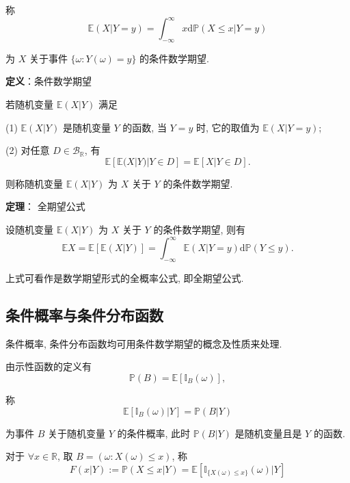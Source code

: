 \documentclass[openany]{ctexbook}
\theoremstyle{kaiti}
\theoremstyle{normal}
\begin{document}
称
\begin{equation}
  \mathbb{E}(X|Y=y)=\int_{-\infty}^\infty x\mathrm{d}\mathbb{P}(X\leqslant x|Y=y)
\end{equation}

为 $X$ 关于事件 $\{\omega:Y(\omega)=y\}$ 的条件数学期望.

\textbf{定义}：条件数学期望

若随机变量 $\mathbb{E}(X|Y)$ 满足

(1) $\mathbb{E}(X|Y)$ 是随机变量 $Y$ 的函数, 当 $Y=y$ 时, 它的取值为 $\mathbb{E}(X|Y=y)$;

(2) 对任意 $D\in\mathcal{B}_{\mathbb{R}}$, 有
\begin{equation}
  \mathbb{E}[\mathbb{E}(X|Y)|Y\in D]=\mathbb{E}[X|Y\in D].
\end{equation}

则称随机变量 $\mathbb{E}(X|Y)$ 为 $X$ 关于 $Y$ 的条件数学期望.

\textbf{定理}： 全期望公式

设随机变量 $\mathbb{E}(X|Y)$ 为 $X$ 关于 $Y$ 的条件数学期望, 则有
\begin{equation}
  \mathbb{E}X=\mathbb{E}[\mathbb{E}(X|Y)]=\int_{-\infty}^\infty \mathbb{E}(X|Y=y)\mathrm{d}\mathbb{P}(Y\leqslant y).
\end{equation}

上式可看作是数学期望形式的全概率公式, 即全期望公式.

\subsection{条件概率与条件分布函数}

条件概率, 条件分布函数均可用条件数学期望的概念及性质来处理. 

由示性函数的定义有
\begin{equation}
  \mathbb{P}(B)=\mathbb{E}[\mathbb{I}_B(\omega)],
\end{equation}

称
\begin{equation}
  \mathbb{E}[\mathbb{I}_B(\omega)|Y]=\mathbb{P}(B|Y)
\end{equation}

为事件 $B$ 关于随机变量 $Y$ 的条件概率, 此时 $\mathbb{P}(B|Y)$ 是随机变量且是 $Y$ 的函数.

对于 $\forall x\in\mathbb{R}$, 取 $B=(\omega:X(\omega)\leqslant x)$, 称
\begin{equation}
  F(x|Y):= \mathbb{P}(X\leqslant x|Y)=\mathbb{E}[\mathbb{I}_{\{X(\omega)\leqslant x\}}(\omega)|Y]
\end{equation}
\end{document}
